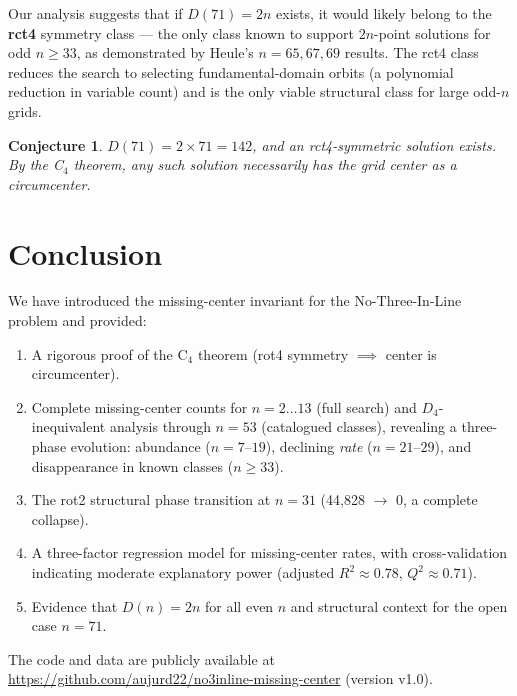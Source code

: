 \documentclass[11pt,a4paper]{article}
\theoremstyle{plain}
\newtheorem{conjecture}[theorem]{Conjecture}
\theoremstyle{definition}
\begin{document}
Our analysis suggests that if $D(71)=2n$ exists, it would likely belong to the \textbf{rct4} symmetry class --- the only class known to support $2n$-point solutions for odd $n\ge 33$, as demonstrated by Heule's $n=65,67,69$ results. The rct4 class reduces the search to selecting fundamental-domain orbits (a polynomial reduction in variable count) and is the only viable structural class for large odd-$n$ grids.

\begin{conjecture}
$D(71)=2\times71=142$, and an rct4-symmetric solution exists. By the C$_4$ theorem, any such solution necessarily has the grid center as a circumcenter.
\end{conjecture}

\section{Conclusion}
\label{sec:conc}

We have introduced the missing-center invariant for the No-Three-In-Line problem and provided:
\begin{enumerate}[nosep]
\item A rigorous proof of the C$_4$ theorem (rot4 symmetry $\implies$ center is circumcenter).
\item Complete missing-center counts for $n=2\dots13$ (full search) and $D_4$-inequivalent analysis through $n=53$ (catalogued classes), revealing a three-phase evolution: abundance ($n=7$--$19$), declining \emph{rate} ($n=21$--$29$), and disappearance in known classes ($n\ge33$).
\item The rot2 structural phase transition at $n=31$ (44,828 $\to$ 0, a complete collapse).
\item A three-factor regression model for missing-center rates, with cross-validation indicating moderate explanatory power (adjusted $R^2\approx0.78$, $Q^2\approx0.71$).
\item Evidence that $D(n)=2n$ for all even $n$ and structural context for the open case $n=71$.
\end{enumerate}

The code and data are publicly available at \url{https://github.com/aujurd22/no3inline-missing-center} (version v1.0).



\end{document}

